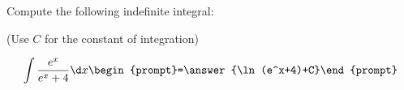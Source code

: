 \documentclass{ximera}
\author{Jim Talamo}
\begin{document}
\begin{exercise}
Compute the following indefinite integral:

\begin{prompt} (Use $C$ for the constant of integration) \end{prompt}

\[
\int \frac{e^x}{e^x+4} \d x 
\begin{prompt}=\answer{\ln(e^x+4)+C}\end{prompt}
\]
\end{exercise}
\end{document}
